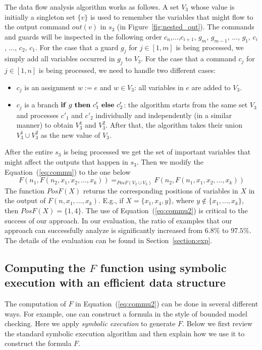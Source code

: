 \documentclass{llncs}
\newcommand{\ite}[3]{
	 \ifmmode
	 \mathbf{if}\ #1 \ \mathbf{then}\ #2\  \mathbf{else}\ #3
	 \else
	 \textbf{if}\ #1 \ \textbf{then}\ #2\  \textbf{else}\ #3
	 \fi}
\begin{document}
The data flow analysis algorithm works as follows.
A set $V_3$ whose value is initially a singleton set $\{v\}$ is used to remember the variables that might flow to the output command $out(v)$ in $s_3$ (in Figure~\ref{fig:nested_out}).
The commands and guards will be inspected in the following order $c_{n}$,$\ldots$,$c_{i+1}$, $g_m$, $g_{m-1}$, $\ldots$, $g_1$, $c_i$, $\ldots$, $c_2$, $c_1$. For the case that a guard $g_j$ for $j\in [1,m]$ is being processed, we simply add all variables occurred in $g_j$ to $V_3$.
For the case that a command $c_j$ for $j\in [1,n]$ is being processed, we need to handle two different cases:
\begin{itemize}
	\item $c_j$ is an assignment $w:=e$ and $w\in V_3$: all variables in $e$ are added to $V_3$.
	\item $c_j$ is a branch $\ite{g}{c'_1}{c'_2}$: the algorithm starts from the same set $V_3$ and processes $c'_1$ and $c'_2$ individually and independently (in a similar manner) to obtain $V_3^1$ and $V_3^2$. After that, the algorithm takes their union $V_3^1\cup V_3^2$ as the new value of $V_3$.
\end{itemize}
After the entire $s_3$ is being processed we get the set of important variables that might affect the outputs that happen in $s_3$.
Then we modify the Equation~(\ref{eq:commu}) to the one below
\begin{equation}
F(n_1, F(n_2,x_1,x_2,\ldots,x_k) )=_{PosF(V_2\cup V_3)} F(n_2, F(n_1,x_1,x_2,\ldots,x_k) )
\label{eq:commu2}
\end{equation}
The function $PosF(X)$ returns the corresponding positions of variables in $X$ in the output of $F(n,x_1,\ldots,x_k) $. E.g., if $X = \{x_1,x_4,y\}$, where $y\notin \{x_1,\ldots,x_k\}$, then $PosF(X)=\{1,4\}$.
The use of Equation~(\ref{eq:commu2}) is critical to the success of our approach. In our evaluation, the ratio of examples that our approach can successfully analyze is significantly increased from $6.8\%$ to $97.5\%$. The details of the evaluation can be found in Section~\ref{section:exp}.

\subsection{Computing the $F$ function using symbolic execution with an efficient data structure}
\label{section:opt2}

The computation of $F$ in Equation~(\ref{eq:commu2}) can be done in several different ways. For example, one can construct a formula in the style of bounded model checking. Here we apply \emph{symbolic execution} to generate $F$. Below we first review the standard symbolic execution algorithm and then explain how we use it to construct the formula $F$.
\end{document}
